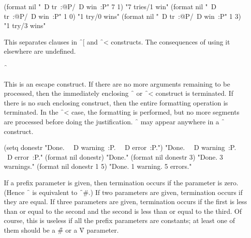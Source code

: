 \code
 (format nil "~D tr~:@P/~D win~:P" 7 1) \EV "7 tries/1 win"
 (format nil "~D tr~:@P/~D win~:P" 1 0) \EV "1 try/0 wins"
 (format nil "~D tr~:@P/~D win~:P" 1 3) \EV "1 try/3 wins"
\endcode

\endsubsubsection%

\endsubsection%





This separates clauses in \f{~[} and \f{~<} constructs.
The consequences of using it elsewhere are undefined.

\endsubsubsection%



{\f{~\hat }}

This is an escape construct.  If there are no more arguments remaining to
be processed, then the immediately           
enclosing \f{~\lbr  } or \f{~<} construct
is terminated.  If there is no such enclosing construct, then the entire
formatting operation is terminated.  
In the \f{~<} case, the formatting
is performed, but no more segments are processed before doing the
justification.     
\f{~\hat } may appear anywhere in a \f{~\lbr  }
construct.

\code
 (setq donestr "Done.~{\hat} ~D warning~:P.~{\hat} ~D error~:P.")
\EV "Done.~{\hat} ~D warning~:P.~{\hat} ~D error~:P."
 (format nil donestr) \EV "Done."
 (format nil donestr 3) \EV "Done. 3 warnings."
 (format nil donestr 1 5) \EV "Done. 1 warning. 5 errors."
\endcode
                                

If a prefix parameter is given, then termination occurs if the parameter
is zero.  (Hence \f{~{\hat}} is equivalent to 
\f{~\#{\hat}}.)  If two
parameters are given, termination occurs if they are equal.
  If three
parameters are given, termination occurs if the first is less than or
equal to the second and the second is less than or equal to the third.
Of course, this is useless if all the prefix parameters are constants; at
least one of them should be a \f{\#} or a \f{V} parameter.


